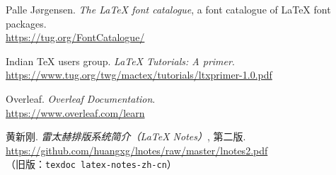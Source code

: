\begin{thebibliography}{20}
 Palle J{\o}rgensen.
  \newblock \emph{The \LaTeX{} font catalogue}, a font catalogue of \LaTeX{} font packages.\\
  \url{https://tug.org/FontCatalogue/}

 Indian \TeX{} users group.
  \newblock \emph{\LaTeX{} Tutorials: A primer}. \\
  \url{https://www.tug.org/twg/mactex/tutorials/ltxprimer-1.0.pdf}

 Overleaf.
  \newblock \emph{Overleaf Documentation}. \\
  \url{https://www.overleaf.com/learn}

 黄新刚.
  \newblock \emph{雷太赫排版系统简介（\LaTeX{} Notes）}, 第二版. \\
  \url{https://github.com/huangxg/lnotes/raw/master/lnotes2.pdf} \\
  （旧版：\texttt{texdoc latex-notes-zh-cn}）

\end{thebibliography}

\endinput
